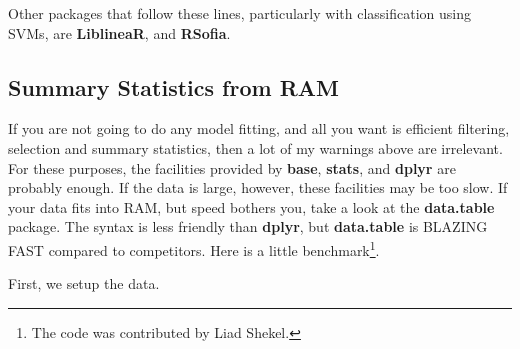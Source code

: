 \documentclass[]{book}
\newenvironment{Shaded}{\begin{snugshade}}{\end{snugshade}}
\newcommand{\KeywordTok}[1]{\textcolor[rgb]{0.13,0.29,0.53}{\textbf{#1}}}
\newcommand{\DataTypeTok}[1]{\textcolor[rgb]{0.13,0.29,0.53}{#1}}
\newcommand{\DecValTok}[1]{\textcolor[rgb]{0.00,0.00,0.81}{#1}}
\newcommand{\FloatTok}[1]{\textcolor[rgb]{0.00,0.00,0.81}{#1}}
\newcommand{\StringTok}[1]{\textcolor[rgb]{0.31,0.60,0.02}{#1}}
\newcommand{\CommentTok}[1]{\textcolor[rgb]{0.56,0.35,0.01}{\textit{#1}}}
\newcommand{\OtherTok}[1]{\textcolor[rgb]{0.56,0.35,0.01}{#1}}
\newcommand{\ControlFlowTok}[1]{\textcolor[rgb]{0.13,0.29,0.53}{\textbf{#1}}}
\newcommand{\OperatorTok}[1]{\textcolor[rgb]{0.81,0.36,0.00}{\textbf{#1}}}
\newcommand{\NormalTok}[1]{#1}
\theoremstyle{definition}
\theoremstyle{definition}
\theoremstyle{definition}
\theoremstyle{remark}
\begin{document}
Other packages that follow these lines, particularly with classification
using SVMs, are \textbf{LiblineaR}, and \textbf{RSofia}.

\subsection{Summary Statistics from
RAM}\label{summary-statistics-from-ram}

If you are not going to do any model fitting, and all you want is
efficient filtering, selection and summary statistics, then a lot of my
warnings above are irrelevant. For these purposes, the facilities
provided by \textbf{base}, \textbf{stats}, and \textbf{dplyr} are
probably enough. If the data is large, however, these facilities may be
too slow. If your data fits into RAM, but speed bothers you, take a look
at the \textbf{data.table} package. The syntax is less friendly than
\textbf{dplyr}, but \textbf{data.table} is BLAZING FAST compared to
competitors. Here is a little benchmark\footnote{The code was
  contributed by Liad Shekel.}.

First, we setup the data.

\begin{Shaded}
\end{Shaded}
\end{document}

